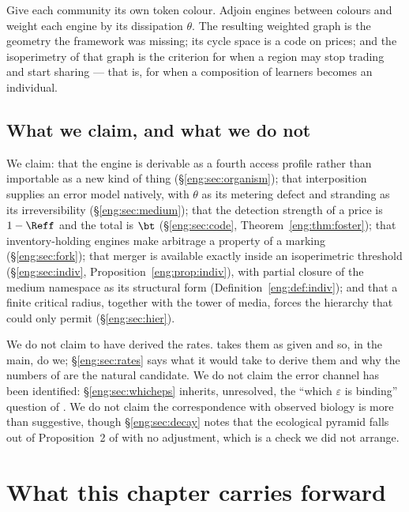 Give each community its own token colour. Adjoin engines between colours
and weight each engine by its dissipation $\theta$. The resulting weighted
graph is the geometry the framework was missing; its cycle space is a code
on prices; and the isoperimetry of that graph is the criterion for when a
region may stop trading and start sharing --- that is, for when a
composition of learners becomes an individual.

\subsection{What we claim, and what we do not}\label{eng:S1.3}

We claim: that the engine is derivable as a fourth access profile rather
than importable as a new kind of thing (\S\ref{eng:sec:organism}); that
interposition supplies an error model natively, with $\theta$ as its
metering defect and stranding as its irreversibility
(\S\ref{eng:sec:medium}); that the
detection strength of a price is $1-\Reff$ and the total is $\bt$
(\S\ref{eng:sec:code}, Theorem~\ref{eng:thm:foster}); that inventory-holding
engines make arbitrage a property of a marking (\S\ref{eng:sec:fork}); that
merger is available exactly inside an isoperimetric threshold
(\S\ref{eng:sec:indiv}, Proposition~\ref{eng:prop:indiv}), with partial closure of
the medium namespace as its structural form
(Definition~\ref{eng:def:indiv}); and that a finite critical radius, together
with the tower of media, forces the hierarchy that \chComp could
only permit (\S\ref{eng:sec:hier}).

We do not claim to have derived the rates. \cite{vtok} takes them as given
and so, in the main, do we; \S\ref{eng:sec:rates} says what it would take to
derive them and why the numbers of \chGame are the natural candidate.
We do not claim the error channel has been identified: \S\ref{eng:sec:whicheps}
inherits, unresolved, the ``which $\varepsilon$ is binding'' question of
\cite{compaut}. We do not claim the correspondence with observed biology is
more than suggestive, though \S\ref{eng:sec:decay} notes that the ecological
pyramid falls out of Proposition~2 of \cite{vtok} with no adjustment, which
is a check we did not arrange.

\section{What this chapter carries forward}\label{eng:S2}

